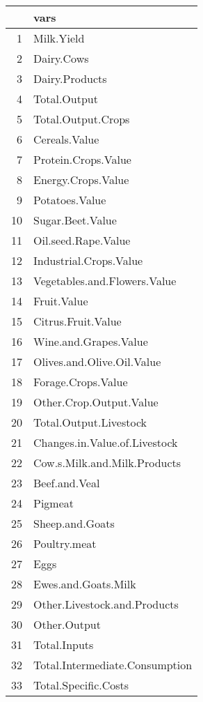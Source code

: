 \documentclass{article}\usepackage{graphicx, color}
\begin{document}
\begin{flushleft}
\newpage
\begin{table}[ht]
\begin{center}
\begin{tabular}{rl}
  \hline
 & vars \\ 
  \hline
1 & Milk.Yield \\ 
  2 & Dairy.Cows \\ 
  3 & Dairy.Products \\ 
  4 & Total.Output \\ 
  5 & Total.Output.Crops \\ 
  6 & Cereals.Value \\ 
  7 & Protein.Crops.Value \\ 
  8 & Energy.Crops.Value \\ 
  9 & Potatoes.Value \\ 
  10 & Sugar.Beet.Value \\ 
  11 & Oil.seed.Rape.Value \\ 
  12 & Industrial.Crops.Value \\ 
  13 & Vegetables.and.Flowers.Value \\ 
  14 & Fruit.Value \\ 
  15 & Citrus.Fruit.Value \\ 
  16 & Wine.and.Grapes.Value \\ 
  17 & Olives.and.Olive.Oil.Value \\ 
  18 & Forage.Crops.Value \\ 
  19 & Other.Crop.Output.Value \\ 
  20 & Total.Output.Livestock \\ 
  21 & Changes.in.Value.of.Livestock \\ 
  22 & Cow.s.Milk.and.Milk.Products \\ 
  23 & Beef.and.Veal \\ 
  24 & Pigmeat \\ 
  25 & Sheep.and.Goats \\ 
  26 & Poultry.meat \\ 
  27 & Eggs \\ 
  28 & Ewes.and.Goats.Milk \\ 
  29 & Other.Livestock.and.Products \\ 
  30 & Other.Output \\ 
  31 & Total.Inputs \\ 
  32 & Total.Intermediate.Consumption \\ 
  33 & Total.Specific.Costs \\ 

\end{tabular}
\end{center}
\end{table}
\end{flushleft}
\end{document}
